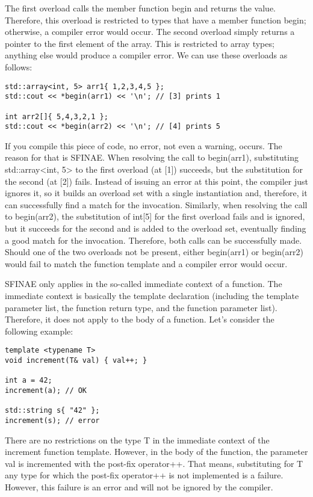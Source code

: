 The first overload calls the member function begin and returns the value. Therefore, this overload is restricted to types that have a member function begin; otherwise, a compiler error would occur. The second overload simply returns a pointer to the first element of the array. This is restricted to array types; anything else would produce a compiler error.
We can use these overloads as follows:

\begin{lstlisting}[style=styleCXX]
std::array<int, 5> arr1{ 1,2,3,4,5 };
std::cout << *begin(arr1) << '\n'; // [3] prints 1

int arr2[]{ 5,4,3,2,1 };
std::cout << *begin(arr2) << '\n'; // [4] prints 5
\end{lstlisting}

If you compile this piece of code, no error, not even a warning, occurs. The reason for that is SFINAE. When resolving the call to begin(arr1), substituting std::array<int, 5> to the first overload (at [1]) succeeds, but the substitution for the second (at [2]) fails. Instead of issuing an error at this point, the compiler just ignores it, so it builds an overload set with a single instantiation and, therefore, it can successfully find a match for the invocation. Similarly, when resolving the call to begin(arr2), the substitution of int[5] for the first overload fails and is ignored, but it succeeds for the second and is added to the overload set, eventually finding a good match for the invocation. Therefore, both calls can be successfully made. Should one of the two overloads not be present, either begin(arr1) or begin(arr2) would fail to match the function template and a compiler error would occur.

SFINAE only applies in the so-called immediate context of a function. The immediate context is basically the template declaration (including the template parameter list, the function return type, and the function parameter list). Therefore, it does not apply to the body of a function. Let’s consider the following example:

\begin{lstlisting}[style=styleCXX]
template <typename T>
void increment(T& val) { val++; }

int a = 42;
increment(a); // OK

std::string s{ "42" };
increment(s); // error
\end{lstlisting}

There are no restrictions on the type T in the immediate context of the increment function template. However, in the body of the function, the parameter val is incremented with the post-fix operator++. That means, substituting for T any type for which the post-fix operator++ is not implemented is a failure. However, this failure is an error and will not be ignored by the compiler.

